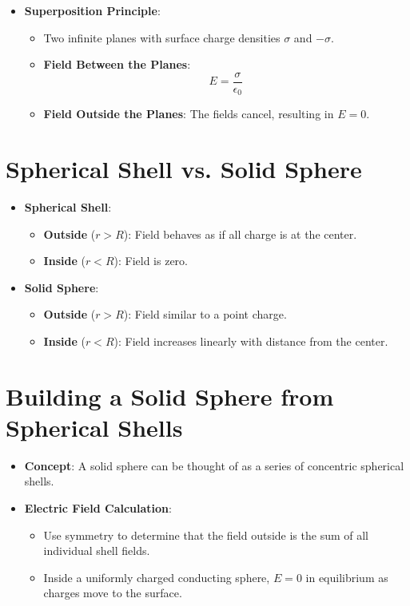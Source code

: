 \documentclass{article}
\begin{document}
\begin{itemize}
    \item \textbf{Superposition Principle}:
    \begin{itemize}
        \item Two infinite planes with surface charge densities \(\sigma\) and \(-\sigma\).
        \item \textbf{Field Between the Planes}:
        \[
        E = \frac{\sigma}{\epsilon_0}
        \]
        \item \textbf{Field Outside the Planes}: The fields cancel, resulting in \(E = 0\).
    \end{itemize}
\end{itemize}

\section*{Spherical Shell vs. Solid Sphere}
\begin{itemize}
    \item \textbf{Spherical Shell}:
    \begin{itemize}
        \item \textbf{Outside} (\(r > R\)): Field behaves as if all charge is at the center.
        \item \textbf{Inside} (\(r < R\)): Field is zero.
    \end{itemize}
    \item \textbf{Solid Sphere}:
    \begin{itemize}
        \item \textbf{Outside} (\(r > R\)): Field similar to a point charge.
        \item \textbf{Inside} (\(r < R\)): Field increases linearly with distance from the center.
    \end{itemize}
\end{itemize}

\section*{Building a Solid Sphere from Spherical Shells}
\begin{itemize}
    \item \textbf{Concept}: A solid sphere can be thought of as a series of concentric spherical shells.
    \item \textbf{Electric Field Calculation}:
    \begin{itemize}
        \item Use symmetry to determine that the field outside is the sum of all individual shell fields.
        \item Inside a uniformly charged conducting sphere, \(E = 0\) in equilibrium as charges move to the surface.
    \end{itemize}
\end{itemize}
\end{document}
